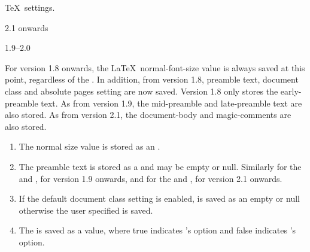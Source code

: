 \begin{numbered}
\item\label{jdr:imagetex}\TeX\ settings.
\begin{jdrversion}{2.1 onwards}
\begin{syntaxline}
  
   
\end{syntaxline}
\end{jdrversion}
\begin{jdrversion}{1.9--2.0}
\begin{syntaxline}
  
 
\end{syntaxline}
\end{jdrversion}
\begin{jdrversion}{1.8}
\begin{syntaxline}
  
\end{syntaxline}
\end{jdrversion}
For version 1.8 onwards, the \LaTeX\ \gls{normal-font-size} value is always
saved at this point, regardless of the
\hyperref[jdr:settings-id]{}.  In addition, from
version 1.8, preamble text, document class and absolute pages
setting are now saved. Version 1.8 only stores the \gls{early-preamble}
text.  As from version 1.9, the \gls{mid-preamble} and
\gls{late-preamble} text are also stored. As from version 2.1, 
the \gls{document-body} and \glspl{magic-comment} are also stored.
\begin{enumerate}
\item The normal size value  is stored as an .

\item The preamble text  is stored as a 
and may be empty or null. Similarly for the 
and , for version 1.9 onwards, and for the
 and , for version 2.1 onwards.

\item If the default document class setting is enabled,  is saved as an empty or null  otherwise the user
specified  is saved.

\item The  is saved as a  value,
where true indicates 's 
option and false indicates 's
 option.
\end{enumerate}


\end{numbered}
